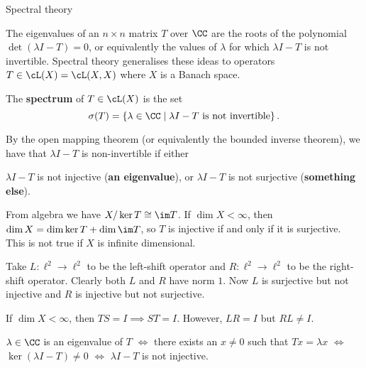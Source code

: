 Spectral theory

The eigenvalues of an $n \times n$ matrix $T$ over $\CC$ are the roots of the polynomial $\det(\lambda I-T)=0$, or equivalently the values of $\lambda$ for which $\lambda I-T$ is not invertible.
Spectral theory generalises these ideas to operators $T \in \cL(X) = \cL(X,X)$ where $X$ is a Banach space.

\begin{defn}
  The \textbf{spectrum} of $T \in \cL(X)$ is the set
  \[ \sigma(T) = \left\{ \lambda \in \CC \mid \lambda I-T \text{ is not invertible} \right\}. \]
\end{defn}

\begin{rmk}
  \leavevmode
  \begin{enum}
    \io
    By the open mapping theorem (or equivalently the bounded inverse theorem), we have that $\lambda I-T$ is non-invertible if either
    \begin{enum}
    \io $\lambda I-T$ is not injective (\textbf{an eigenvalue}), or
    \io $\lambda I-T$ is not surjective (\textbf{something else}).
    \end{enum}

    \io
    From algebra we have $X/\ker T \cong \im T$.
    If $\dim X < \infty$, then $\dim X = \dim\ker T + \dim\im T$, so $T$ is injective if and only if it is surjective.
    This is not true if $X$ is infinite dimensional.

    Take $L: \ell^2 \to \ell^2$ to be the left-shift operator and $R: \ell^2 \to \ell^2$ to be the right-shift operator.
    Clearly both $L$ and $R$ have norm $1$.
    Now $L$ is surjective but not injective and $R$ is injective but not surjective.

    \io
    If $\dim X<\infty$, then $TS=I \implies ST=I$.
    However, $LR=I$ but $RL \neq I$.

    \io
    $\lambda \in \CC$ is an eigenvalue of $T$ $\iff$ there exists an $x \neq 0$ such that $Tx=\lambda x$ $\iff$ $\ker(\lambda I-T) \neq 0$ $\iff$ $\lambda I-T$ is not injective.
  \end{enum}
\end{rmk}
